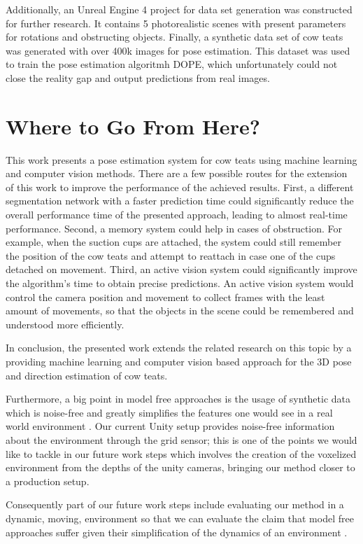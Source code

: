     Additionally, an Unreal Engine 4 project for data set generation was constructed for further research. It contains 5 photorealistic scenes with present parameters for rotations and obstructing objects. Finally, a synthetic data set of cow teats was generated with over 400k images for pose estimation. This dataset was used to train the pose estimation algoritmh DOPE, which unfortunately could not close the reality gap and output predictions from real images.

\section{Where to Go From Here?}\label{sec:future-work}
    This work presents a pose estimation system for cow teats using machine learning and computer vision methods. There are a few possible routes for the extension of this work to improve the performance of the achieved results. First, a different segmentation network with a faster prediction time could significantly reduce the overall performance time of the presented approach, leading to almost real-time performance. Second, a memory system could help in cases of obstruction. For example, when the suction cups are attached, the system could still remember the position of the cow teats and attempt to reattach in case one of the cups detached on movement. Third, an active vision system could significantly improve the algorithm's time to obtain precise predictions. An active vision system would control the camera position and movement to collect frames with the least amount of movements, so that the objects in the scene could be remembered and understood more efficiently.
    
    In conclusion, the presented work extends the related research on this topic by a providing machine learning and computer vision based approach for the 3D pose and direction estimation of cow teats.
    
  
    Furthermore, a big point in model free approaches is the usage of synthetic data which is noise-free and greatly simplifies the features one would see in a real world environment \cite{wang2018look}. Our current Unity setup provides noise-free information about the environment through the grid sensor; this is one of the points we would like to tackle in our future work steps which involves the creation of the voxelized environment from the depths of the unity cameras, bringing our method closer to a production setup.
    
    Consequently part of our future work steps include evaluating our method in a dynamic, moving, environment so that we can evaluate the claim that model free approaches suffer given their simplification of the dynamics of an environment \cite{wang2018look}.

